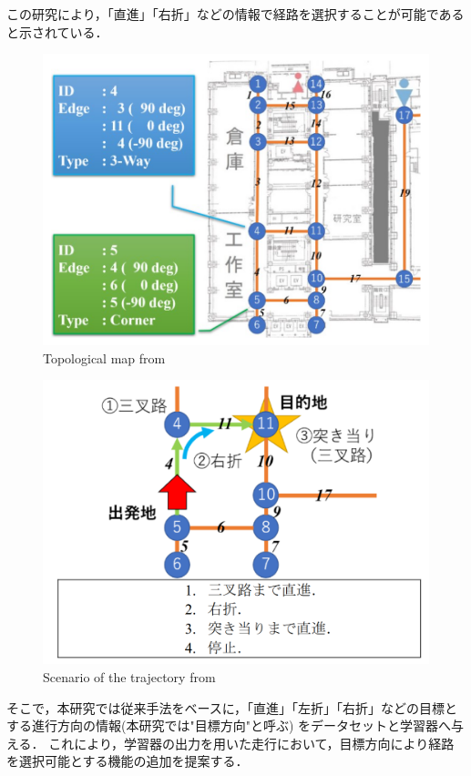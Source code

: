 この研究により，「直進」「右折」などの情報で経路を選択することが可能であると示されている．
\begin{figure}[H]
    \centering
    \includegraphics[width = 13cm]{./figs/topo.png}
    \caption{Topological map from\cite{simada}}
    \label{fig::topo}
\end{figure}
\begin{figure}[H]
    \centering
    \includegraphics[width = 13cm]{./figs/sina.png}
    \caption{Scenario of the trajectory from \cite{simada}}
    \label{fig::sina}
\end{figure}

そこで，本研究では従来手法をベースに，「直進」「左折」「右折」などの目標とする進行方向の情報(本研究では"目標方向"と呼ぶ)
をデータセットと学習器へ与える．
これにより，学習器の出力を用いた走行において，目標方向により経路を選択可能とする機能の追加を提案する．

